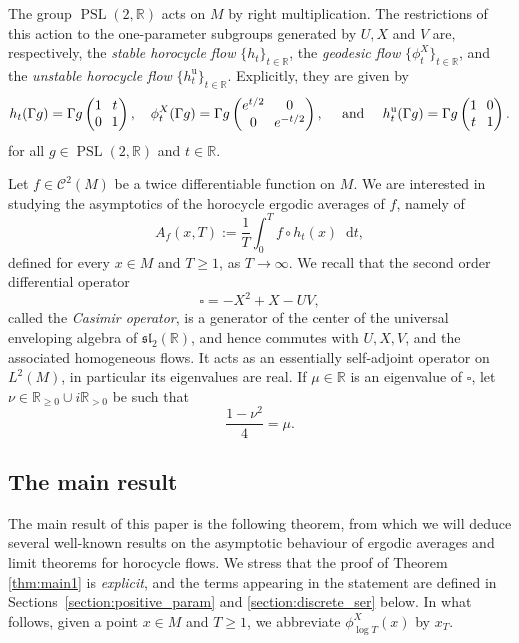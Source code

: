 \documentclass[JEP,XML,SOM,NoEqCountersInSection,Unicode,published]{cedram}
\newcommand \R{\mathbb{R}}
\newcommand*{\diff}{\mathop{}\!\mathrm{d}}
\newcommand{\aver}[1]{A_{#1}(x,T)}
\DeclareMathOperator{\PSL}{PSL}
\DeclareMathOperator{\un}{u}
\theoremstyle{definition}
\begin{document}
The group $\PSL(2,\R)$ acts on $M$ by right multiplication.
The restrictions of this action to the one-parameter subgroups generated by $U, X$ and $V$ are, respectively, the \emph{stable horocycle flow} $\{h_t\}_{t \in \R}$, the \emph{geodesic flow} $\{\phi^X_t\}_{t \in \R}$, and the \emph{unstable horocycle flow} $\{h^{\un}_t\}_{t \in \R}$.
Explicitly, they are given by\enlargethispage{.5\baselineskip}
\[\arraycolsep3.5pt
h_t(\Gamma g) = \Gamma g
\begin{pmatrix}
1 & t \\
0 & 1
\end{pmatrix},
\quad
\phi^X_t(\Gamma g) = \Gamma g
\begin{pmatrix}
e^{t/2} & 0 \\
0 & e^{-t/2}
\end{pmatrix},
\quad \text{ and } \quad
h^{\un}_t(\Gamma g) = \Gamma g
\begin{pmatrix}
1 & 0 \\
t & 1
\end{pmatrix}.
\]
for all $g \in \PSL(2,\R)$ and $t \in \R$.

Let $f \in \mathscr{C}^2(M)$ be a twice differentiable function on $M$.
We are interested in studying the asymptotics of the horocycle ergodic averages of $f$, namely of\vspace*{-3pt}
\[
\aver{f} := \frac{1}{T} \int_0^T f \circ h_t (x) \diff t,
\]
defined for every $x \in M$ and $T \geq 1$, as $T \to \infty$.
We recall that the second order differential operator\vspace*{-3pt}
\[
\square = -X^2+X-UV,
\]
called the \emph{Casimir operator}, is a generator of the center of the universal enveloping algebra of $\mathfrak{sl}_2(\R)$, and hence commutes with $U, X, V$, and the associated homogeneous flows.
It acts as an essentially self-adjoint operator on $L^2(M)$, in particular its eigenvalues are real.
If $\mu \in\R$ is an eigenvalue of $\square$, let $\nu \in \R_{\geq 0 } \cup i \R_{>0}$ be such that\vspace*{-3pt}
\[
\frac{1-\nu^2}{4} = \mu.
\]

\subsection{The main result}

The main result of this paper is the following theorem, from which we will deduce several well-known results on the asymptotic behaviour of ergodic averages and limit theorems for horocycle flows.
We stress that the proof of Theorem \ref{thm:main1} is \emph{explicit}, and the terms appearing in the statement are defined in Sections~\ref{section:positive_param} and \ref{section:discrete_ser} below.
In what follows, given a point $x\in M$ and $T\geq 1$, we abbreviate $\phi^X_{\log T}(x)$ by $x_T$.
\end{document}
